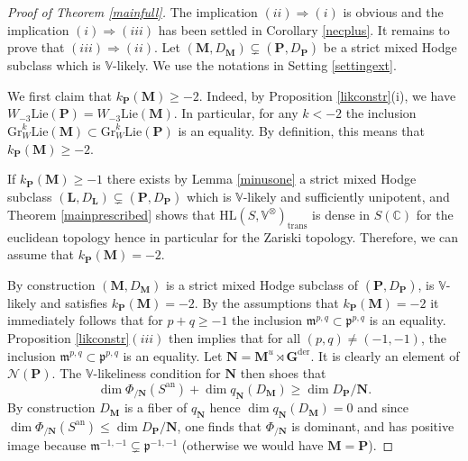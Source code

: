 \documentclass[10pt]{article}
\numberwithin{equation}{subsection}
\theoremstyle{plain}
\theoremstyle{definition}
\theoremstyle{remark}
\newcommand{\lie}{\mathrm{Lie}}
\newcommand{\Q}{\mathbb Q}
\newcommand{\C}{\mathbb C}
\newcommand{\V}{\mathbb V}
\newcommand{\G}{\mathbf G}
\newcommand{\pp}{\mathbf P}
\newcommand{\M}{\mathbf M}
\newcommand{\LL}{\mathbf L}
\newcommand{\NN}{\mathbf N}
\newcommand{\HL}{\mathrm{HL}(S, \V^\otimes)}
\newcommand{\an}{\mathrm{an}}
\newcommand{\gr}{\mathrm{Gr}}
\newcommand{\gl}{\mathbf{GL}}
\newcommand{\para}{\mathfrak{p}}
\newcommand{\lieu}{\mathfrak{u}}
\newcommand{\mt}{\mathfrak{m}}
\newcommand{\der}{\mathrm{der}}
\newcommand{\trans}{\mathrm{trans}}
\newcommand{\Np}{\mathcal{N}(\pp)}
\begin{document}
\begin{proof}[Proof of Theorem \ref{mainfull}]
The implication $(ii) \Rightarrow (i)$ is obvious and the implication $(i) \Rightarrow (iii)$ has been settled in Corollary \ref{necplus}. It remains to prove that $(iii) \Rightarrow (ii)$. Let $(\M, D_\M) \subsetneq (\pp, D_\pp)$ be a strict mixed Hodge subclass which is $\V$-likely. We use the notations in Setting \ref{settingext}.

We first claim that $k_\pp(\M) \geqslant -2$. Indeed, by Proposition \ref{likconstr}(i), we have $W_{-3} \lie(\pp) = W_{-3} \lie(\M)$. In particular, for any $k < -2$ the inclusion $\gr_W^k \lie(\M) \subset \gr_W^k \lie(\pp)$ is an equality. By definition, this means that $k_\pp(\M) \geqslant -2$.

If $k_\pp(\M) \geqslant -1$ there exists by Lemma \ref{minusone} a strict mixed Hodge subclass $(\LL,D_\LL) \subsetneq (\pp, D_\pp)$ which is $\V$-likely and sufficiently unipotent, and Theorem \ref{mainprescribed} shows that $\HL_\trans$ is dense in $S(\C)$ for the euclidean topology hence in particular for the Zariski topology. Therefore, we can assume that $k_\pp(\M) = -2$.


By construction $(\M,D_\M)$ is a strict mixed Hodge subclass of $(\pp, D_\pp)$, is $\V$-likely and satisfies $k_\pp(\M) = -2$. By the assumptions that $k_\pp(\M) = -2$ it immediately follows that for $p+q \geqslant -1$ the inclusion $\mt^{p,q} \subset \para^{p,q}$ is an equality. Proposition \ref{likconstr}$(iii)$ then implies that for all $(p,q) \neq (-1,-1)$, the inclusion $\mt^{p,q} \subset \para^{p,q}$ is an equality. Let $\NN = \M^u \rtimes \G^\der$. It is clearly an element of $\Np$. The $\V$-likeliness condition for $\NN$ then shoes that
\[
\dim \Phi_{/\NN}(S^\an) + \dim q_\NN(D_\M) \geqslant \dim D_\pp/\NN.
\]
By construction $D_\M$ is a fiber of $q_\NN$ hence $\dim q_\NN(D_\M) = 0$ and since $\dim \Phi_{/\NN}(S^\an) \leqslant \dim D_\pp/\NN$, one finds that $\Phi_{/\NN}$ is dominant, and has positive image because $\mt^{-1,-1} \subsetneq \para^{-1,-1}$ (otherwise we would have $\M = \pp$).


\end{proof}
\end{document}
